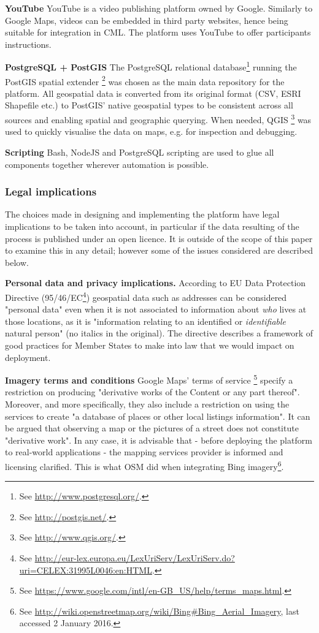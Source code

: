 \textbf{YouTube} YouTube is a video publishing platform owned by Google. Similarly to Google Maps, videos can be embedded in third party websites, hence being suitable for integration in CML. The platform uses YouTube to offer participants instructions.  

\textbf{PostgreSQL + PostGIS} The PostgreSQL relational database\footnote{See \url{http://www.postgresql.org/}.} running the PostGIS spatial extender \footnote{See \url{http://postgis.net/}.} was chosen as the main data repository for the platform. All geospatial data is converted from its original format (CSV, ESRI Shapefile etc.) to PostGIS' native geospatial types to be consistent across all sources and enabling spatial and geographic querying. When needed, QGIS \footnote{See \url{http://www.qgis.org/}.} was used to quickly visualise the data on maps, e.g. for inspection and debugging.

\textbf{Scripting} Bash, NodeJS and PostgreSQL scripting are used to glue all components together wherever automation is possible.  

\subsubsection{Legal implications}

The choices made in designing and implementing the platform have legal implications to be taken into account, in particular if the data resulting of the process is published under an open licence. It is outside of the scope of this paper to examine this in any detail; however some of the issues considered are described below.

\textbf{Personal data and privacy implications.} According to EU Data Protection Directive (95/46/EC\footnote{See \url{http://eur-lex.europa.eu/LexUriServ/LexUriServ.do?uri=CELEX:31995L0046:en:HTML}.}) geospatial data such as addresses can be considered "personal data" even when it is not associated to information about {\it who} lives at those locations, as it is "information relating to an identified or {\it identifiable} natural person" (no italics in the original). The directive describes a framework of good practices for Member States to make into law that we would impact on deployment.
	
\textbf{Imagery terms and conditions} Google Maps' terms of service \footnote{See \url{https://www.google.com/intl/en-GB_US/help/terms_maps.html}.} specify a restriction on producing "derivative works of the Content or any part thereof". Moreover, and more specifically, they also include a restriction on using the services to create "a database of places or other local listings information". It can be argued that observing a map or the pictures of a street does not constitute "derivative work". In any case, it is advisable that - before deploying the platform to real-world applications - the mapping services provider is informed and licensing clarified. This is what OSM did when integrating Bing imagery\footnote{See \url{http://wiki.openstreetmap.org/wiki/Bing#Bing_Aerial_Imagery}, last accessed 2 January 2016.}.

